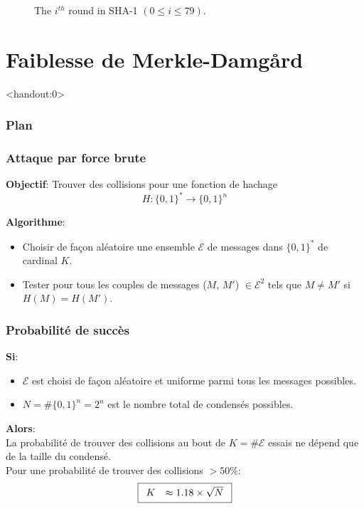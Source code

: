 \begin{frame}[fragile]
\begin{figure}[!ht]
\begin{tikzpicture}[scale=0.8]
        \end{tikzpicture}
        \caption{\label{fig:SHA-1}The $i^{th}$ round in SHA-1 $(0\le i \le 79)$.}
\end{figure}

\end{frame}
\section{Faiblesse de Merkle-Damg\r{a}rd}

\begin{frame}<handout:0>
  \frametitle{Plan}
  \tableofcontents[currentsection]
\end{frame}

\begin{frame}
  \frametitle{Attaque par force brute}
  \vfill
\textbf{Objectif}: Trouver des collisions pour une fonction de hachage $$H: \{0,1\}^* \rightarrow \{0,1\}^n$$

\textbf{Algorithme}:
\begin{itemize}
        \item Choisir de façon aléatoire une ensemble $\mathcal{E}$ de messages dans $\{0,1\}^*$ de cardinal $K$.
        \item Tester pour tous les couples de messages ($M$, $M'$) $\in \mathcal{E}^2$ tels que $M \neq M'$ si $H(M)=H(M')$.
\end{itemize}
  \vfill
\end{frame}

\begin{frame}
  \frametitle{Probabilité de succès}
  \vfill
  \textbf{Si}:
  \begin{itemize}
        \item $\mathcal{E}$ est choisi de façon aléatoire et uniforme parmi tous les messages possibles.
        \item $N = \# \{0,1\}^n = 2^n $ est le nombre total de condensés possibles.
  \end{itemize}
  \vspace{1cm}
  \textbf{Alors}:\\ 
  La probabilité de trouver des collisions au bout de $K=\# \mathcal{E}$ essais ne dépend que de la taille du condensé.\\
Pour une probabilité de trouver des collisions \textbf{$>50\%$}:
\begin{equation}
   \fbox{$
   \begin{array}{rcl}
      K & \approx 1.18 \times \sqrt{N}\\
   \end{array}
   $}
   \end{equation}
  \vfill
\end{frame}

